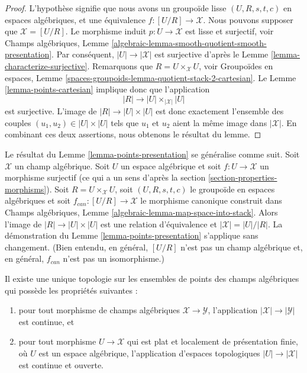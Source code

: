 \begin{proof}
L'hypothèse signifie que nous avons un groupoïde lisse $(U, R, s, t, c)$
en espaces algébriques, et une équivalence $f : [U/R] \to \mathcal{X}$.
Nous pouvons supposer que $\mathcal{X} = [U/R]$.
Le morphisme induit $p : U \to \mathcal{X}$ est lisse et surjectif, voir
Champs algébriques,
Lemme \ref{algebraic-lemma-smooth-quotient-smooth-presentation}.
Par conséquent, $|U| \to |\mathcal{X}|$ est surjective d'après le
Lemme \ref{lemma-characterize-surjective}.
Remarquons que $R = U \times_\mathcal{X} U$, voir
Groupoïdes en espaces,
Lemme \ref{spaces-groupoids-lemma-quotient-stack-2-cartesian}.
Le
Lemme \ref{lemma-points-cartesian}
implique donc que l'application
$$
|R| \longrightarrow |U| \times_{|\mathcal{X}|} |U|
$$
est surjective. L'image de $|R| \to |U| \times |U|$ est donc
exactement l'ensemble des couples $(u_1, u_2) \in |U| \times |U|$
tels que $u_1$ et $u_2$ aient la même image dans $|\mathcal{X}|$.
En combinant ces deux assertions, nous obtenons le résultat du lemme.
\end{proof}

\begin{remark}
\label{remark-more-general-presentation}
Le résultat du
Lemme \ref{lemma-points-presentation}
se généralise comme suit.
Soit $\mathcal{X}$ un champ algébrique.
Soit $U$ un espace algébrique et soit $f : U \to \mathcal{X}$ un morphisme surjectif
(ce qui a un sens d'après la
section \ref{section-properties-morphisms}).
Soit $R = U \times_\mathcal{X} U$, soit $(U, R, s, t, c)$ le groupoïde
en espaces algébriques et soit $f_{can} : [U/R] \to \mathcal{X}$ le
morphisme canonique construit dans
Champs algébriques, Lemme \ref{algebraic-lemma-map-space-into-stack}.
Alors l'image de $|R| \to |U| \times |U|$ est une relation d'équivalence
et $|\mathcal{X}| = |U|/|R|$. La démonstration du
Lemme \ref{lemma-points-presentation}
s'applique sans changement. (Bien entendu, en général, $[U/R]$ n'est pas un champ
algébrique et, en général, $f_{can}$ n'est pas un isomorphisme.)
\end{remark}

\begin{lemma}
\label{lemma-topology-points}
Il existe une unique topologie sur les ensembles de points
des champs algébriques qui possède les propriétés suivantes :
\begin{enumerate}
\item pour tout morphisme de champs algébriques $\mathcal{X} \to \mathcal{Y}$,
l'application $|\mathcal{X}| \to |\mathcal{Y}|$ est continue, et
\item pour tout morphisme $U \to \mathcal{X}$ qui est plat et localement
de présentation finie, où $U$ est un espace algébrique,
l'application d'espaces topologiques $|U| \to |\mathcal{X}|$ est continue et ouverte.
\end{enumerate}
\end{lemma}

